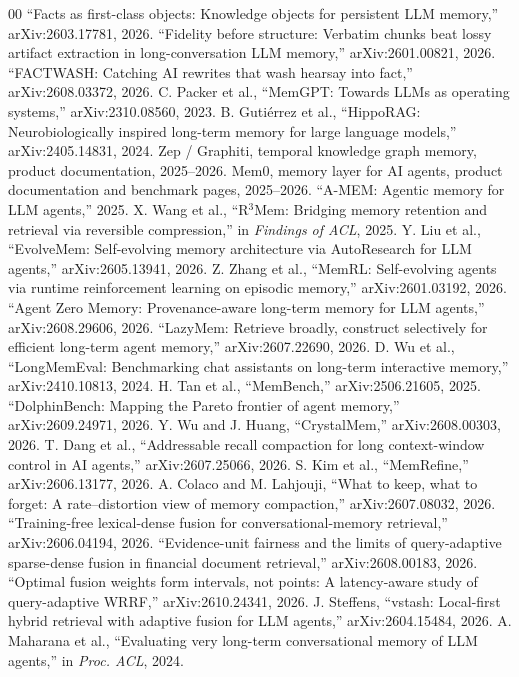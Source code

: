 \documentclass[journal]{IEEEtran}
\begin{document}
\begin{thebibliography}{00}
 ``Facts as first-class objects: Knowledge objects for persistent LLM memory,'' arXiv:2603.17781, 2026.
 ``Fidelity before structure: Verbatim chunks beat lossy artifact extraction in long-conversation LLM memory,'' arXiv:2601.00821, 2026.
 ``FACTWASH: Catching AI rewrites that wash hearsay into fact,'' arXiv:2608.03372, 2026.
 C. Packer et al., ``MemGPT: Towards LLMs as operating systems,'' arXiv:2310.08560, 2023.
 B. Guti\'errez et al., ``HippoRAG: Neurobiologically inspired long-term memory for large language models,'' arXiv:2405.14831, 2024.
 Zep / Graphiti, temporal knowledge graph memory, product documentation, 2025--2026.
 Mem0, memory layer for AI agents, product documentation and benchmark pages, 2025--2026.
 ``A-MEM: Agentic memory for LLM agents,'' 2025.
 X. Wang et al., ``R$^3$Mem: Bridging memory retention and retrieval via reversible compression,'' in \emph{Findings of ACL}, 2025.
 Y. Liu et al., ``EvolveMem: Self-evolving memory architecture via AutoResearch for LLM agents,'' arXiv:2605.13941, 2026.
 Z. Zhang et al., ``MemRL: Self-evolving agents via runtime reinforcement learning on episodic memory,'' arXiv:2601.03192, 2026.
 ``Agent Zero Memory: Provenance-aware long-term memory for LLM agents,'' arXiv:2608.29606, 2026.
 ``LazyMem: Retrieve broadly, construct selectively for efficient long-term agent memory,'' arXiv:2607.22690, 2026.
 D. Wu et al., ``LongMemEval: Benchmarking chat assistants on long-term interactive memory,'' arXiv:2410.10813, 2024.
 H. Tan et al., ``MemBench,'' arXiv:2506.21605, 2025.
 ``DolphinBench: Mapping the Pareto frontier of agent memory,'' arXiv:2609.24971, 2026.
 Y. Wu and J. Huang, ``CrystalMem,'' arXiv:2608.00303, 2026.
 T. Dang et al., ``Addressable recall compaction for long context-window control in AI agents,'' arXiv:2607.25066, 2026.
 S. Kim et al., ``MemRefine,'' arXiv:2606.13177, 2026.
 A. Colaco and M. Lahjouji, ``What to keep, what to forget: A rate--distortion view of memory compaction,'' arXiv:2607.08032, 2026.
 ``Training-free lexical-dense fusion for conversational-memory retrieval,'' arXiv:2606.04194, 2026.
 ``Evidence-unit fairness and the limits of query-adaptive sparse-dense fusion in financial document retrieval,'' arXiv:2608.00183, 2026.
 ``Optimal fusion weights form intervals, not points: A latency-aware study of query-adaptive WRRF,'' arXiv:2610.24341, 2026.
 J. Steffens, ``vstash: Local-first hybrid retrieval with adaptive fusion for LLM agents,'' arXiv:2604.15484, 2026.
 A. Maharana et al., ``Evaluating very long-term conversational memory of LLM agents,'' in \emph{Proc. ACL}, 2024.
\end{thebibliography}
\end{document}
